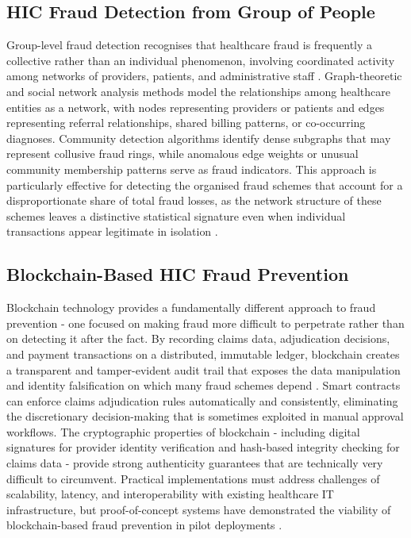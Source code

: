 \subsection{HIC Fraud Detection from Group of People}

Group-level fraud detection recognises that healthcare fraud is frequently a collective rather than an individual phenomenon, involving coordinated activity among networks of providers, patients, and administrative staff \cite{sun2018patient}. Graph-theoretic and social network analysis methods model the relationships among healthcare entities as a network, with nodes representing providers or patients and edges representing referral relationships, shared billing patterns, or co-occurring diagnoses. Community detection algorithms identify dense subgraphs that may represent collusive fraud rings, while anomalous edge weights or unusual community membership patterns serve as fraud indicators. This approach is particularly effective for detecting the organised fraud schemes that account for a disproportionate share of total fraud losses, as the network structure of these schemes leaves a distinctive statistical signature even when individual transactions appear legitimate in isolation \cite{hassan2019}.

\subsection{Blockchain-Based HIC Fraud Prevention}

Blockchain technology provides a fundamentally different approach to fraud prevention - one focused on making fraud more difficult to perpetrate rather than on detecting it after the fact. By recording claims data, adjudication decisions, and payment transactions on a distributed, immutable ledger, blockchain creates a transparent and tamper-evident audit trail that exposes the data manipulation and identity falsification on which many fraud schemes depend \cite{alhashedi2021}. Smart contracts can enforce claims adjudication rules automatically and consistently, eliminating the discretionary decision-making that is sometimes exploited in manual approval workflows. The cryptographic properties of blockchain - including digital signatures for provider identity verification and hash-based integrity checking for claims data - provide strong authenticity guarantees that are technically very difficult to circumvent. Practical implementations must address challenges of scalability, latency, and interoperability with existing healthcare IT infrastructure, but proof-of-concept systems have demonstrated the viability of blockchain-based fraud prevention in pilot deployments \cite{amponsah2022}.

